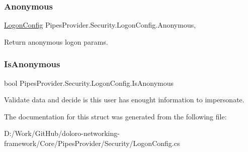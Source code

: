 \subsubsection{\texorpdfstring{Anonymous}{Anonymous}}
{\footnotesize\ttfamily \mbox{\hyperlink{struct_pipes_provider_1_1_security_1_1_logon_config}{Logon\+Config}} Pipes\+Provider.\+Security.\+Logon\+Config.\+Anonymous\hspace{0.3cm}{\ttfamily [static]}, {\ttfamily [get]}}



Return anonymous logon params. 

\mbox{\label{struct_pipes_provider_1_1_security_1_1_logon_config_a75522f37bf91bbd20f01fa4498d28dd1}} 
\subsubsection{\texorpdfstring{Is\+Anonymous}{IsAnonymous}}
{\footnotesize\ttfamily bool Pipes\+Provider.\+Security.\+Logon\+Config.\+Is\+Anonymous\hspace{0.3cm}{\ttfamily [get]}}



Validate data and decide is this user has enought information to impersonate. 



The documentation for this struct was generated from the following file\+:\begin{DoxyCompactItemize}
\item 
D\+:/\+Work/\+Git\+Hub/doloro-\/networking-\/framework/\+Core/\+Pipes\+Provider/\+Security/Logon\+Config.\+cs\end{DoxyCompactItemize}
